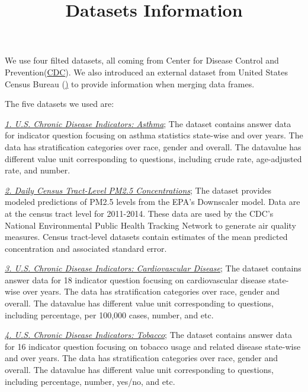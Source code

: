 \documentclass{article}
\title{Datasets Information}
\begin{document}
\maketitle

\section{}
We use four filted datasets, all coming from  Center for Disease Control and Prevention(\href{https://chronicdata.cdc.gov/Chronic-Disease-Inicators/U-S-Chronic-Disease-Indicators-CDI-/g4ie-h725}{CDC}). We also introduced an external dataset from United States Census Bureau (\href{https://www.census.gov/library/reference/code-lists/ansi/ansi-codes-for-states.html}) to provide information when merging data frames. 

The five datasets we used are:

\href{https://chronicdata.cdc.gov/Chronic-Disease-Indicators/U-S-Chronic-Disease-Indicators-Asthma/us8e-ubyj}{\textit{1. U.S. Chronic Disease Indicators: Asthma}}; The dataset contains answer data for indicator question focusing on asthma statistics state-wise and over years. The data has stratification categories over race, gender and overall. The datavalue has different value unit corresponding to questions, including crude rate, age-adjusted rate, and number.

\href{https://data.cdc.gov/Environmental-Health-Toxicology/Daily-Census-Tract-Level-PM2-5-Concentrations-2011/fcqm-xrf4}{\textit{2. Daily Census Tract-Level PM2.5 Concentrations}}; The dataset provides modeled predictions of PM2.5 levels from the EPA's Downscaler model. Data are at the census tract level for 2011-2014. These data are used by the CDC's National Environmental Public Health Tracking Network to generate air quality measures. Census tract-level datasets contain estimates of the mean predicted concentration and associated standard error. 

\href{https://chronicdata.cdc.gov/Chronic-Disease-Indicators/U-S-Chronic-Disease-Indicators-Cardiovascular-Dise/232j-jiq5}{\textit{3. U.S. Chronic Disease Indicators: Cardiovascular Disease}}; The dataset contains answer data for 18 indicator question focusing on cardiovascular disease state-wise over years. The data has stratification categories over race, gender and overall. The datavalue has different value unit corresponding to questions, including percentage, per 100,000 cases, number, and etc.

\href{https://chronicdata.cdc.gov/Chronic-Disease-Indicators/U-S-Chronic-Disease-Indicators-Tobacco/rrbt-bhen}{\textit{4. U.S. Chronic Disease Indicators: Tobacco}}; The dataset contains answer data for 16 indicator question focusing on tobacco usage and related disease state-wise and over years. The data has stratification categories over race, gender and overall. The datavalue has different value unit corresponding to questions, including percentage, number, yes/no, and etc.
\end{document}
